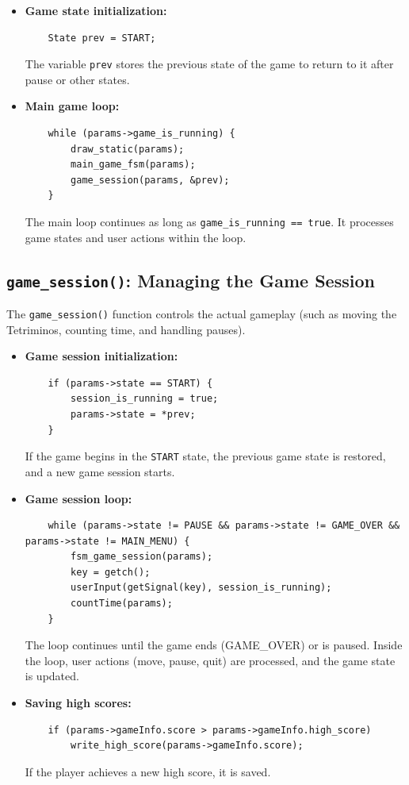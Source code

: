\documentclass{article}
\begin{document}
\begin{itemize}
    \item \textbf{Game state initialization:}
    \begin{verbatim}
    State prev = START;
    \end{verbatim}
    The variable \texttt{prev} stores the previous state of the game to return to it after pause or other states.

    \item \textbf{Main game loop:}
    \begin{verbatim}
    while (params->game_is_running) {
        draw_static(params);
        main_game_fsm(params);
        game_session(params, &prev);
    }
    \end{verbatim}
    The main loop continues as long as \texttt{game\_is\_running == true}. It processes game states and user actions within the loop.
\end{itemize}

\subsection{\texttt{game\_session()}: Managing the Game Session}

The \texttt{game\_session()} function controls the actual gameplay (such as moving the Tetriminos, counting time, and handling pauses).

\begin{itemize}
    \item \textbf{Game session initialization:}
    \begin{verbatim}
    if (params->state == START) {
        session_is_running = true;
        params->state = *prev;
    }
    \end{verbatim}
    If the game begins in the \texttt{START} state, the previous game state is restored, and a new game session starts.

    \item \textbf{Game session loop:}
    \begin{verbatim}
    while (params->state != PAUSE && params->state != GAME_OVER && params->state != MAIN_MENU) {
        fsm_game_session(params);
        key = getch();
        userInput(getSignal(key), session_is_running);
        countTime(params);
    }
    \end{verbatim}
    The loop continues until the game ends (GAME\_OVER) or is paused. Inside the loop, user actions (move, pause, quit) are processed, and the game state is updated.
    
    \item \textbf{Saving high scores:}
    \begin{verbatim}
    if (params->gameInfo.score > params->gameInfo.high_score)
        write_high_score(params->gameInfo.score);
    \end{verbatim}
    If the player achieves a new high score, it is saved.
\end{itemize}
\end{document}
